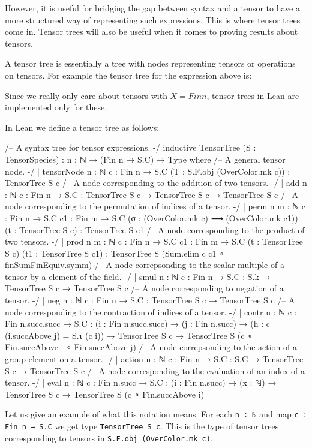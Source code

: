 \documentclass[a4paper, 11pt]{article}
\begin{document}
However, it is useful for bridging the gap between syntax and a tensor to have a more structured way 
of representing such expressions.
This is where tensor trees come in. Tensor trees will also be useful when it comes to proving 
results about tensors. 

A tensor tree is essentially a tree with nodes representing tensors or operations on tensors.
For example the tensor tree for the expression above is: 

Since we really only care about tensors with $X = Fin n$, tensor trees in Lean are 
    implemented only for these. 

In Lean we define a tensor tree as follows: 
\begin{codeLong}
/-- A syntax tree for tensor expressions. -/
inductive TensorTree (S : TensorSpecies) : {n : ℕ} → (Fin n → S.C) → Type where
  /-- A general tensor node. -/
  | tensorNode {n : ℕ} {c : Fin n → S.C} (T : S.F.obj (OverColor.mk c)) : TensorTree S c
  /-- A node corresponding to the addition of two tensors. -/
  | add {n : ℕ} {c : Fin n → S.C} : TensorTree S c → TensorTree S c → TensorTree S c
  /-- A node corresponding to the permutation of indices of a tensor. -/
  | perm {n m : ℕ} {c : Fin n → S.C} {c1 : Fin m → S.C}
      (σ : (OverColor.mk c) ⟶ (OverColor.mk c1)) (t : TensorTree S c) : TensorTree S c1
  /-- A node corresponding to the product of two tensors. -/
  | prod {n m : ℕ} {c : Fin n → S.C} {c1 : Fin m → S.C}
    (t : TensorTree S c) (t1 : TensorTree S c1) : TensorTree S (Sum.elim c c1 ∘ finSumFinEquiv.symm)
  /-- A node correpsonding to the scalar multiple of a tensor by a element of the field. -/
  | smul {n : ℕ} {c : Fin n → S.C} : S.k → TensorTree S c → TensorTree S c
  /-- A node corresponding to negation of a tensor. -/
  | neg {n : ℕ} {c : Fin n → S.C} : TensorTree S c → TensorTree S c
  /-- A node corresponding to the contraction of indices of a tensor. -/
  | contr {n : ℕ} {c : Fin n.succ.succ → S.C} : (i : Fin n.succ.succ) →
    (j : Fin n.succ) → (h : c (i.succAbove j) = S.τ (c i)) → TensorTree S c →
    TensorTree S (c ∘ Fin.succAbove i ∘ Fin.succAbove j)
  /-- A node correpsonding to the action of a group element on a tensor. -/
  | action {n : ℕ} {c : Fin n → S.C} : S.G → TensorTree S c → TensorTree S c
  /-- A node corresponding to the evaluation of an index of a tensor. -/
  | eval {n : ℕ} {c : Fin n.succ → S.C} : (i : Fin n.succ) → (x : ℕ) → TensorTree S c →
    TensorTree S (c ∘ Fin.succAbove i)
\end{codeLong}
Let us give an example of what this notation means. For each \lstinline|n : ℕ| and map 
\lstinline|c : Fin n → S.C| we get type \lstinline|TensorTree S c|. This is the type of
tensor trees corresponding to tensors in \lstinline|S.F.obj (OverColor.mk c)|.
\end{document}
